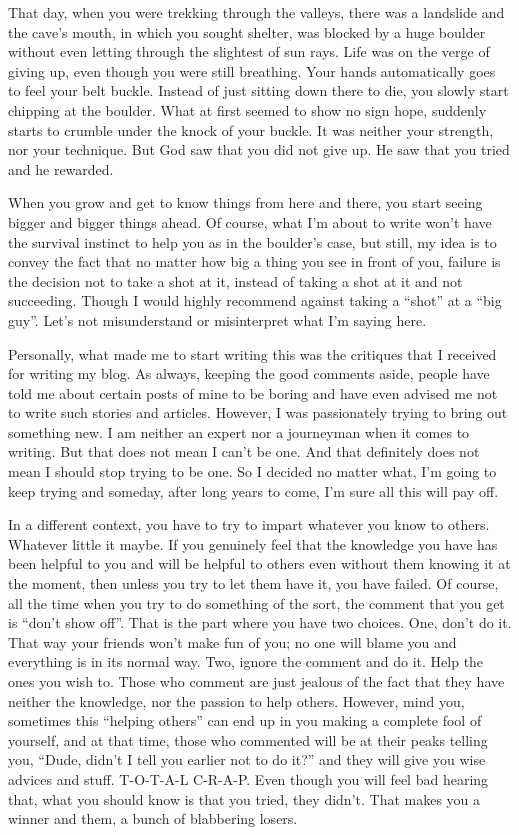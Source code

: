 \documentclass[twoside,11pt,titlepage]{article}
\begin{document}
That day, when you were trekking through the valleys, there was a landslide and the cave's mouth, in which you sought shelter, was blocked by a huge boulder without even letting through the slightest of sun rays. Life was on the verge of giving up, even though you were still breathing. Your hands automatically goes to feel your belt buckle. Instead of just sitting down there to die, you slowly start chipping at the boulder. What at first seemed to show no sign hope, suddenly starts to crumble under the knock of your buckle. It was neither your strength, nor your technique. But God saw that you did not give up. He saw that you tried and he rewarded.

When you grow and get to know things from here and there, you start seeing bigger and bigger things ahead. Of course, what I'm about to write won't have the survival instinct to help you as in the boulder's case, but still, my idea is to convey the fact that no matter how big a thing you see in front of you, failure is the decision not to take a shot at it, instead of taking a shot at it and not succeeding. Though I would highly recommend against taking a ``shot'' at a ``big guy''. Let's not misunderstand or misinterpret what I'm saying here.

Personally, what made me to start writing this was the critiques that I received for writing my blog. As always, keeping the good comments aside, people have told me about certain posts of mine to be boring and have even advised me not to write such stories and articles. However, I was passionately trying to bring out something new. I am neither an expert nor a journeyman when it comes to writing. But that does not mean I can't be one. And that definitely does not mean I should stop trying to be one. So I decided no matter what, I'm going to keep trying and someday, after long years to come, I'm sure all this will pay off.

In a different context, you have to try to impart whatever you know to others. Whatever little it maybe. If you genuinely feel that the knowledge you have has been helpful to you and will be helpful to others even without them knowing it at the moment, then unless you try to let them have it, you have failed. Of course, all the time when you try to do something of the sort, the comment that you get is ``don't show off''. That is the part where you have two choices. One, don't do it. That way your friends won't make fun of you; no one will blame you and everything is in its normal way. Two, ignore the comment and do it. Help the ones you wish to. Those who comment are just jealous of the fact that they have neither the knowledge, nor the passion to help others. However, mind you, sometimes this ``helping others'' can end up in you making a complete fool of yourself, and at that time, those who commented will be at their peaks telling you, ``Dude, didn't I tell you earlier not to do it?'' and they will give you wise advices and stuff. T-O-T-A-L C-R-A-P. Even though you will feel bad hearing that, what you should know is that you tried, they didn't. That makes you a winner and them, a bunch of blabbering losers.
\end{document}
